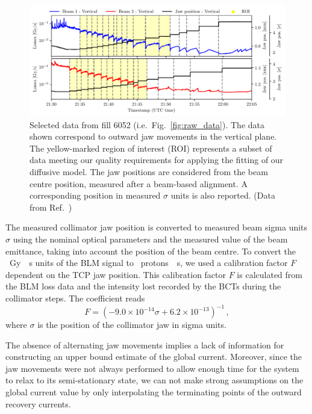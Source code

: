 \begin{figure}[htp]
    \centering
    \includegraphics[width=\textwidth]{5_Diffusion_measurement_LHC/figs/first.pdf}
    \caption{Selected data from fill 6052 (i.e.\ Fig.~\ref{fig:raw_data}). The data shown correspond to outward jaw movements in the vertical plane. The yellow-marked region of interest (ROI) represents a subset of data meeting our quality requirements for applying the fitting of our diffusive model. The jaw positions are considered from the beam centre position, measured after a beam-based alignment. A corresponding position in measured $\sigma$ units is also reported. (Data from Ref.~\cite{PhysRevAccelBeams.23.044802})}
    \label{fig:first}
\end{figure}


The measured collimator jaw position is converted to measured beam sigma units $\sigma$ using the nominal optical parameters and the measured value of the beam emittance, taking into account the position of the beam centre. To convert the \SI{}{Gy \per s} units of the BLM signal to \SI{}{protons \per s}, we used a calibration factor $F$~\cite{arek} dependent on the TCP jaw position. This calibration factor $F$ is calculated from the BLM loss data and the intensity lost recorded by the BCTs during the collimator steps. The coefficient reads 
\begin{equation}
    F = \left(-9.0\times10^{-14}\sigma + 6.2\times10^{-13}\right)^{-1} \,,
\end{equation}
where $\sigma$ is the position of the collimator jaw in sigma units.

The absence of alternating jaw movements implies a lack of information for constructing an upper bound estimate of the global current. Moreover, since the jaw movements were not always performed to allow enough time for the system to relax to its semi-stationary state, we can not make strong assumptions on the global current value by only interpolating the terminating points of the outward recovery currents. 

